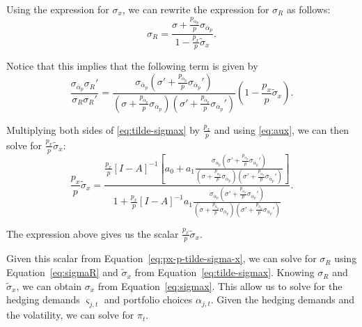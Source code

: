 Using the expression for $\sigma_{x}$, we can rewrite the expression for $ \sigma_R $ as follows:
\begin{equation}\label{eq:sigmaR}
	\sigma_{R} = \frac{\sigma + \frac{p_{\overline{\alpha}_p}}{p} \sigma_{\overline{\alpha}_p}}{1-\frac{p_x}{p} \widetilde{\sigma}_x}. 
\end{equation}

Notice that this implies that the following term is given by
\begin{equation}\label{eq:aux}
	\frac{\sigma_{\overline{\alpha}_p} \sigma_{R}'}{\sigma_{R}\sigma_{R}'} = 
	\frac{\sigma_{\overline{\alpha}_p}\left(\sigma' + \frac{p_{\overline{\alpha}_p}}{p} \sigma_{\overline{\alpha}_p}'\right)}{\left(\sigma + \frac{p_{\overline{\alpha}_p}}{p} \sigma_{\overline{\alpha}_p}\right)\left(\sigma' + \frac{p_{\overline{\alpha}_p}}{p} \sigma_{\overline{\alpha}_p}'\right)} \left( 1-\frac{p_x}{p} \widetilde{\sigma}_x \right).
\end{equation}

Multiplying both sides of \eqref{eq:tilde-sigmax} by $ \frac{p_x}{p} $ and using \eqref{eq:aux}, we can then solve for $\frac{p_x}{p} \widetilde{\sigma}_x$:
\begin{equation}\label{eq:px-p-tilde-sigma-x}
	\frac{p_x}{p} \widetilde{\sigma}_x = \frac{\frac{p_x}{p} [I-A]^{-1} \left[a_0+a_1 \frac{\sigma_{\overline{\alpha}_p}\left(\sigma' + \frac{p_{\overline{\alpha}_p}}{p} \sigma_{\overline{\alpha}_p}'\right)}{\left(\sigma + \frac{p_{\overline{\alpha}_p}}{p} \sigma_{\overline{\alpha}_p}\right)\left(\sigma' + \frac{p_{\overline{\alpha}_p}}{p} \sigma_{\overline{\alpha}_p}'\right)}\right]}{1+\frac{p_x}{p} [I-A]^{-1} a_1 \frac{\sigma_{\overline{\alpha}_p}\left(\sigma' + \frac{p_{\overline{\alpha}_p}}{p} \sigma_{\overline{\alpha}_p}'\right)}{\left(\sigma + \frac{p_{\overline{\alpha}_p}}{p} \sigma_{\overline{\alpha}_p}\right)\left(\sigma' + \frac{p_{\overline{\alpha}_p}}{p} \sigma_{\overline{\alpha}_p}'\right)} }.
\end{equation}

The expression above gives us the scalar $\frac{p_x}{p} \widetilde{\sigma}_x$. 

Given this scalar from Equation~\eqref{eq:px-p-tilde-sigma-x}, we can solve for $\sigma_R$ using Equation~\eqref{eq:sigmaR} and $\widetilde{\sigma}_x$ from Equation~\eqref{eq:tilde-sigmax}. Knowing $ \sigma_R $ and $ \widetilde{\sigma}_x $, we can obtain $\sigma_x$ from Equation~\eqref{eq:sigmax}. This allow us to solve for the hedging demands $\varsigma_{j,t}$ and portfolio choices $\alpha_{j,t}$. Given the hedging demands and the volatility, we can solve for $\pi_t$.


